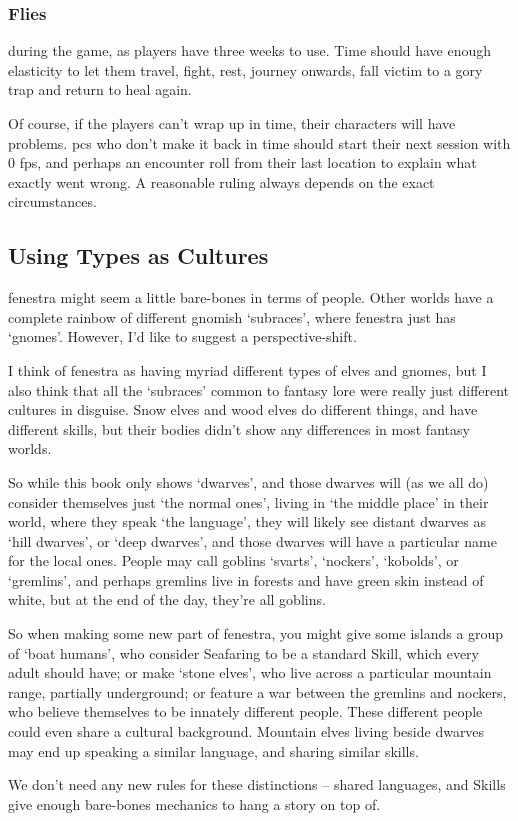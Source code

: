 \begin{multicols}{2}
\subsubsection{ Flies}
during the game, as players have three weeks to use.
Time should have enough elasticity to let them travel, fight, rest, journey onwards, fall victim to a gory trap and return to heal again.

Of course, if the players can't wrap up in time, their characters will have problems.
\Glspl{pc} who don't make it back in time should start their next session with 0 \glspl{fp}, and perhaps an encounter roll from their last location to explain what exactly went wrong.
A reasonable ruling always depends on the exact circumstances.

\subsection{Using Types as Cultures}

\Gls{fenestra} might seem a little bare-bones in terms of people.
Other worlds have a complete rainbow of different gnomish `subraces', where \gls{fenestra} just has `gnomes'.
However, I'd like to suggest a perspective-shift.

I think of \gls{fenestra} as having myriad different types of elves and gnomes, but I also think that all the `subraces' common to fantasy lore were really just different cultures in disguise.
Snow elves and wood elves do different things, and have different skills, but their bodies didn't show any differences in most fantasy worlds.

So while this book only shows `dwarves', and those dwarves will (as we all do) consider themselves just `the normal ones', living in `the middle place' in their world, where they speak `the language', they will likely see distant dwarves as `hill dwarves', or `deep dwarves', and those dwarves will have a particular name for the local ones.
People may call goblins `svarts', `nockers', `kobolds', or `gremlins', and perhaps gremlins live in forests and have green skin instead of white, but at the end of the day, they're all goblins.

So when making some new part of \gls{fenestra}, you might give some islands a group of `boat humans', who consider Seafaring to be a standard Skill, which every adult should have; or make `stone elves', who live across a particular mountain range, partially underground; or feature a war between the gremlins and nockers, who believe themselves to be innately different people.
These different people could even share a cultural background.
Mountain elves living beside dwarves may end up speaking a similar language, and sharing similar skills.

We don't need any new rules for these distinctions -- shared languages, and Skills give enough bare-bones mechanics to hang a story on top of.


\end{multicols}

